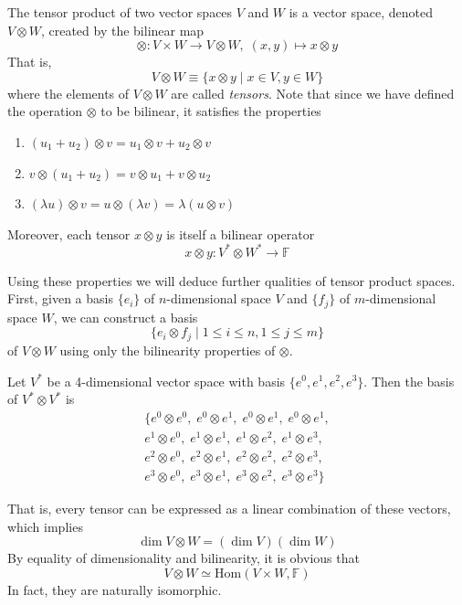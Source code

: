 \documentclass{article}
\begin{document}
    \begin{definition}
    The tensor product of two vector spaces $V$ and $W$ is a vector space, denoted $V \otimes W$, created by the bilinear map 
    \[\otimes: V \times W \longrightarrow V \otimes W, \; (x, y) \mapsto x \otimes y\]
    That is, 
    \[V \otimes W \equiv \{ x \otimes y \; | \; x \in V, y \in W\} \]
    where the elements of $V \otimes W$ are called \textit{tensors}. Note that since we have defined the operation $\otimes$ to be bilinear, it satisfies the properties
    \begin{enumerate}
        \item $(u_1 + u_2) \otimes v = u_1 \otimes v + u_2 \otimes v$
        \item $v \otimes (u_1 + u_2) = v \otimes u_1 + v \otimes u_2$
        \item $(\lambda u) \otimes v = u \otimes (\lambda v) = \lambda (u \otimes v)$ 
    \end{enumerate}
    Moreover, each tensor $x \otimes y$ is itself a bilinear operator
    \[x \otimes y: V^* \otimes W^* \longrightarrow \mathbb{F}\]
    \end{definition}

    Using these properties we will deduce further qualities of tensor product spaces. First, given a basis $\{e_i\}$ of $n$-dimensional space $V$ and $\{f_j\}$ of $m$-dimensional space $W$, we can construct a basis 
    \[\{e_i \otimes f_j \; | \; 1 \leq i \leq n, 1 \leq j \leq m\}\]
    of $V \otimes W$ using only the bilinearity properties of $\otimes$. 

    \begin{example}
    Let $V^*$ be a 4-dimensional vector space with basis $\{ e^0, e^1, e^2, e^3\}$. Then the basis of $V^* \otimes V^*$ is
    \begin{align*} 
    \{e^0 \otimes e^0, \; e^0 \otimes e^1, \;e^0 \otimes e^1, \;e^0 \otimes e^1, \\
    e^1 \otimes e^0,\; e^1 \otimes e^1,\; e^1 \otimes e^2,\; e^1 \otimes e^3, \\
    e^2 \otimes e^0,\; e^2 \otimes e^1,\; e^2 \otimes e^2,\; e^2 \otimes e^3, \\
    e^3 \otimes e^0,\; e^3 \otimes e^1,\; e^3 \otimes e^2,\; e^3 \otimes e^3\}
    \end{align*}
    \end{example}

    That is, every tensor can be expressed as a linear combination of these vectors, which implies
    \[\dim{V \otimes W} = (\dim{V}) (\dim{W})\]
    By equality of dimensionality and bilinearity, it is obvious that
    \[V \otimes W \simeq \text{Hom}(V \times W, \mathbb{F})\]
    In fact, they are naturally isomorphic. 
\end{document}

